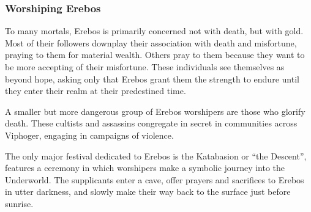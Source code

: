     \subsubsection{Worshiping Erebos}
        To many mortals, Erebos is primarily concerned not with death, but with gold.
        Most of their followers downplay their association with death and misfortune, praying to them for material wealth.
        Others pray to them because they want to be more accepting of their misfortune.
        These individuals see themselves as beyond hope, asking only that Erebos grant them the strength to endure until they enter their realm at their predestined time.

        A smaller but more dangerous group of Erebos worshipers are those who glorify death.
        These cultists and assassins congregate in secret in communities across Viphoger, engaging in campaigns of violence.

        The only major festival dedicated to Erebos is the Katabasion or ``the Descent'', features a ceremony in which worshipers make a symbolic journey into the Underworld.
        The supplicants enter a cave, offer prayers and sacrifices to Erebos in utter darkness, and slowly make their way back to the surface just before sunrise.
